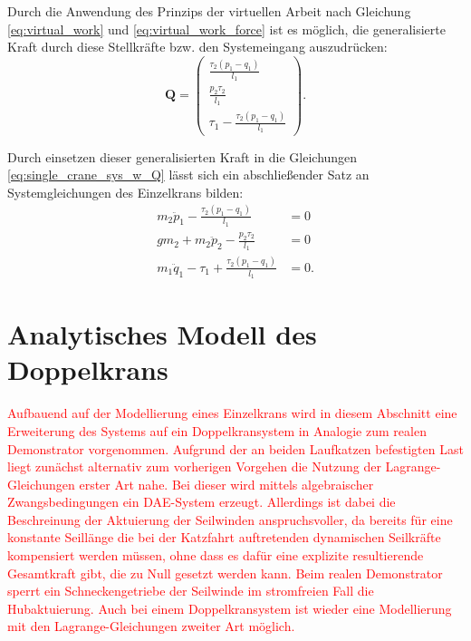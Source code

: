 Durch die Anwendung des Prinzips der virtuellen Arbeit nach Gleichung \eqref{eq:virtual_work} und \eqref{eq:virtual_work_force} ist es möglich, die generalisierte Kraft durch diese Stellkräfte bzw. den Systemeingang auszudrücken:
\begin{equation}
	\mathbf{Q}=
	\left(\begin{matrix}
		\frac{\tau_{2} \left(p_{1} - q_{1}\right)}{l_{1}}\\
		\frac{p_{2} \tau_{2}}{l_{1}}\\
		\tau_{1} - \frac{\tau_{2} \left(p_{1} - q_{1}\right)}{l_{1}}
	\end{matrix}\right).
\end{equation}

Durch einsetzen dieser generalisierten Kraft in die Gleichungen \eqref{eq:single_crane_sys_w_Q} lässt sich ein abschließender Satz an Systemgleichungen des Einzelkrans bilden:
\begin{subequations}
	\begin{align}
		m_{2} \ddot{p}_{1} - \frac{\tau_{2} \left(p_{1} - q_{1}\right)}{l_{1}} &= 0 \label{single_flat_syseq1}\\
		g m_{2} + m_{2} \ddot{p}_{2} - \frac{p_{2} \tau_{2}}{l_{1}} &= 0\label{single_flat_syseq2}\\
		m_{1} \ddot{q}_{1} - \tau_{1} + \frac{\tau_{2} \left(p_{1} - q_{1}\right)}{l_{1}} &= 0\label{single_flat_syseq3}.
	\end{align}
\end{subequations}


\section{Analytisches Modell des Doppelkrans}
\textcolor{red}{Aufbauend auf der Modellierung eines Einzelkrans wird in diesem Abschnitt eine Erweiterung des Systems auf ein Doppelkransystem in Analogie zum realen Demonstrator vorgenommen. Aufgrund der an beiden Laufkatzen befestigten Last liegt zunächst alternativ zum vorherigen Vorgehen die Nutzung der Lagrange-Gleichungen erster Art nahe. Bei dieser wird mittels algebraischer Zwangsbedingungen ein DAE-System erzeugt. Allerdings ist dabei die Beschreinung der Aktuierung der Seilwinden anspruchsvoller, da bereits für eine konstante Seillänge die bei der Katzfahrt auftretenden dynamischen Seilkräfte kompensiert werden müssen, ohne dass es dafür eine explizite resultierende Gesamtkraft gibt, die zu Null gesetzt werden kann. Beim realen Demonstrator sperrt ein Schneckengetriebe der Seilwinde im stromfreien Fall die Hubaktuierung. Auch bei einem Doppelkransystem ist wieder eine Modellierung mit den Lagrange-Gleichungen zweiter Art möglich.}

